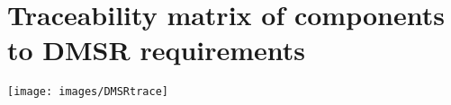 \section{Traceability matrix of components to DMSR requirements \label{sect:trace}}

\texttt{[image: images/DMSRtrace]}
